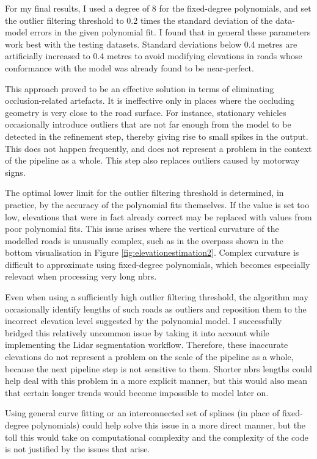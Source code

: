 For my final results, I used a degree of 8 for the fixed-degree polynomials, and set the outlier filtering threshold to 0.2 times the standard deviation of the data-model errors in the given polynomial fit. I found that in general these parameters work best with the testing datasets. Standard deviations below 0.4 metres are artificially increased to 0.4 metres to avoid modifying elevations in roads whose conformance with the model was already found to be near-perfect.

This approach proved to be an effective solution in terms of eliminating occlusion-related artefacts. It is ineffective only in places where the occluding geometry is very close to the road surface. For instance, stationary vehicles occasionally introduce outliers that are not far enough from the model to be detected in the refinement step, thereby giving rise to small spikes in the output. This does not happen frequently, and does not represent a problem in the context of the pipeline as a whole. This step also replaces outliers caused by motorway signs.

The optimal lower limit for the outlier filtering threshold is determined, in practice, by the accuracy of the polynomial fits themselves. If the value is set too low, elevations that were in fact already correct may be replaced with values from poor polynomial fits. This issue arises where the vertical curvature of the modelled roads is unusually complex, such as in the overpass shown in the bottom visualisation in Figure \ref{fig:elevationestimation2}. Complex curvature is difficult to approximate using fixed-degree polynomials, which becomes especially relevant when processing very long \ac{nbrs}.

Even when using a sufficiently high outlier filtering threshold, the algorithm may occasionally identify lengths of such roads as outliers and reposition them to the incorrect elevation level suggested by the polynomial model. I successfully bridged this relatively uncommon issue by taking it into account while implementing the Lidar segmentation workflow. Therefore, these inaccurate elevations do not represent a problem on the scale of the pipeline as a whole, because the next pipeline step is not sensitive to them. Shorter \ac{nbrs} lengths could help deal with this problem in a more explicit manner, but this would also mean that certain longer trends would become impossible to model later on.

Using general curve fitting or an interconnected set of splines (in place of fixed-degree polynomials) could help solve this issue in a more direct manner, but the toll this would take on computational complexity and the complexity of the code is not justified by the issues that arise.

